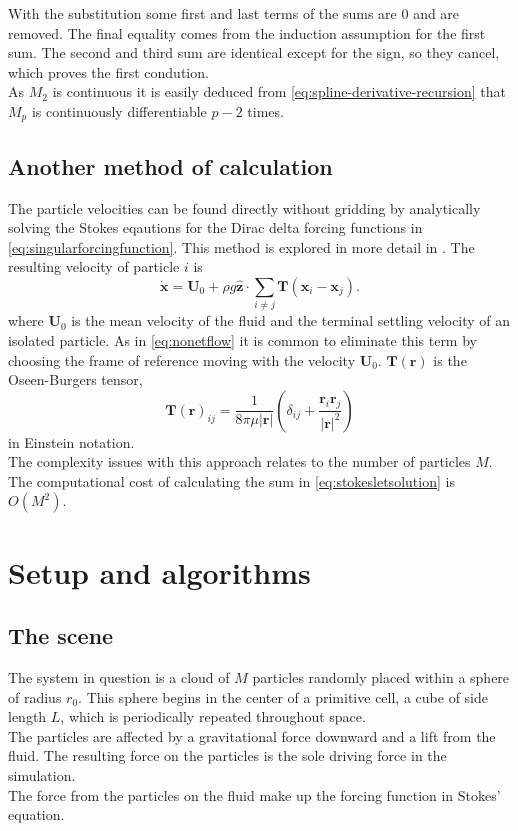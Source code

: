 \documentclass[a4paper,
twoside=false,abstract=false,numbers=noenddot,
titlepage=false,headings=small,parskip=half,version=last]{scrartcl}
\begin{document}
With the substitution some first and last terms of the sums are 0 and are removed.
The final equality comes from the induction assumption for the first sum.
The second and third sum are identical except for the sign, so they cancel, which proves the first condution.\\
As $M_2$ is continuous it is easily deduced from \eqref{eq:spline-derivative-recursion} that $M_p$ is continuously differentiable $p-2$ times.

\subsection{Another method of calculation}
The particle velocities can be found directly without gridding by analytically solving the Stokes eqautions for the Dirac delta forcing functions in \eqref{eq:singularforcingfunction}. This method is explored in more detail in \cite{fallingclouds}.
The resulting velocity of particle $i$ is
\begin{equation}
\dot{\mathbf{x}} = \mathbf{U}_0 + \rho g\hat{\mathbf{z}} \cdot \sum_{i\neq j} \mathbf{T}(\mathbf{x}_i-\mathbf{x}_j).\label{eq:stokesletsolution}
\end{equation}
where $\mathbf{U}_0$ is the mean velocity of the fluid and the terminal settling velocity of an isolated particle.
As in \eqref{eq:nonetflow} it is common to eliminate this term by choosing the frame of reference moving with the velocity $\mathbf{U}_0$. $\mathbf{T}(\mathbf{r})$ is the Oseen-Burgers tensor,
\begin{equation}
\mathbf{T}(\mathbf{r})_{ij} = \frac{1}{8\pi \mu |\mathbf{r}|} \left( \delta_{ij} + \frac{\mathbf{r}_i \mathbf{r}_j}{|\mathbf{r}|^2}\right)\nonumber
\end{equation}
in Einstein notation.\\
The complexity issues with this approach relates to the number of particles $M$. The computational cost of calculating the sum in \eqref{eq:stokesletsolution} is $O(M^2)$.

\section{Setup and algorithms}

\subsection{The scene}
The system in question is a cloud of $M$ particles randomly placed within a sphere of radius $r_0$. This sphere begins in the center of a primitive cell, a cube of side length $L$, which is periodically repeated throughout space.\\
The particles are affected by a gravitational force downward and a lift from the fluid. The resulting force on the particles is the sole driving force in the simulation.\\
The force from the particles on the fluid make up the forcing function in Stokes' equation.
\end{document}
